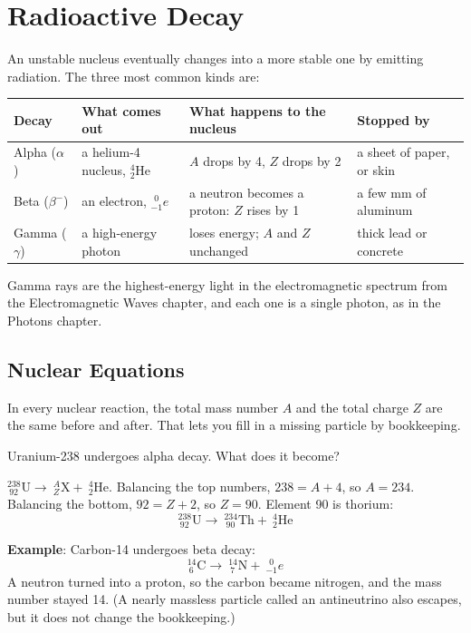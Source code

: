 \section{Radioactive Decay}
An unstable nucleus eventually changes into a more stable one by emitting radiation. The three most
common kinds are:

\begin{center}
\begin{tabular}{l|p{3.3cm}|p{4.4cm}|p{3.0cm}}
Decay & What comes out & What happens to the nucleus & Stopped by \\
\hline
Alpha ($\alpha$) & a helium-4 nucleus, $^4_2\text{He}$ & $A$ drops by 4, $Z$ drops by 2 & a sheet of paper, or skin \\
Beta ($\beta^-$) & an electron, $^{\ \,0}_{-1}e$ & a neutron becomes a proton: $Z$ rises by 1 & a few mm of aluminum \\
Gamma ($\gamma$) & a high-energy photon & loses energy; $A$ and $Z$ unchanged & thick lead or concrete \\
\end{tabular}
\end{center}

Gamma rays are the highest-energy light in the electromagnetic spectrum from the Electromagnetic
Waves chapter, and each one is a single photon, as in the Photons chapter.

\subsection{Nuclear Equations}
In every nuclear reaction, the total mass number $A$ and the total charge $Z$ are the same before and
after. That lets you fill in a missing particle by bookkeeping.

\begin{Worked}
\begin{Problem}
Uranium-238 undergoes alpha decay. What does it become?
\end{Problem}
\begin{Solution}
$^{238}_{\ 92}\text{U} \to\ ^{A}_{Z}\text{X} +\ ^4_2\text{He}$. Balancing the top
numbers, $238 = A + 4$, so $A = 234$. Balancing the bottom, $92 = Z + 2$, so $Z = 90$. Element 90 is
thorium:
$$^{238}_{\ 92}\text{U} \to\ ^{234}_{\ 90}\text{Th} +\ ^4_2\text{He}$$
\end{Solution}
\end{Worked}

\textbf{Example}: Carbon-14 undergoes beta decay:
$$^{14}_{\ 6}\text{C} \to\ ^{14}_{\ 7}\text{N} +\ ^{\ \,0}_{-1}e$$
A neutron turned into a proton, so the carbon became nitrogen, and the mass number stayed 14. (A
nearly massless particle called an antineutrino also escapes, but it does not change the
bookkeeping.)

